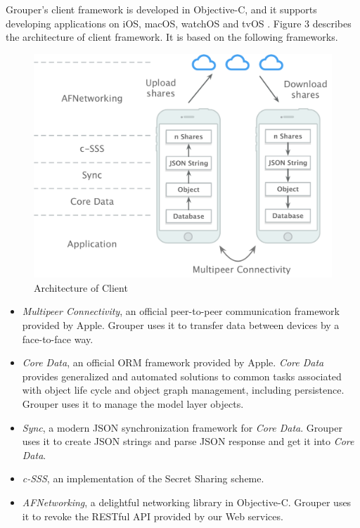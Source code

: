 \documentclass[twocolumn,10pt]{article}
\begin{document}
Grouper's client framework is developed in Objective-C, and it supports developing applications on iOS, macOS, watchOS and tvOS . Figure 3 describes the architecture of client framework. It is based on the following frameworks.   

\begin{figure}[t]
	\centering
	\includegraphics[scale=0.35]{architecture}
	\caption{Architecture of Client}
\end{figure}

\begin{itemize}
	\setlength{\itemsep}{1pt}
	\setlength{\parskip}{0pt}
	\setlength{\parsep}{0pt}
	\item \emph{Multipeer Connectivity}\cite{mc},  an official peer-to-peer communication framework provided by Apple. Grouper uses it to transfer data between devices by a face-to-face way.
	\item \emph{Core Data}\cite{coredata}, an official ORM framework provided by Apple. \emph{Core Data} provides generalized and automated solutions to common tasks associated with object life cycle and object graph management, including persistence. Grouper uses it to manage the model layer objects. 
	\item \emph{Sync}\cite{sync}, a modern JSON synchronization framework for \emph{Core Data}. Grouper uses it to create JSON strings and parse JSON response and get it into \emph{Core Data}.
	\item \emph{c-SSS}\cite{c-sss}, an implementation of the Secret Sharing scheme.
	\item \emph{AFNetworking}\cite{afnetworking}, a delightful networking library in Objective-C. Grouper uses it to revoke the RESTful API provided by our Web services. 
\end{itemize}
\end{document}

